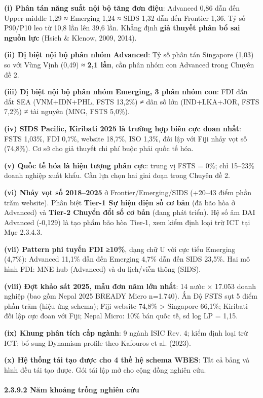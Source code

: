 \documentclass[12pt,a4paper]{article}
\begin{document}
\textbf{(i) Phân tán năng suất nội bộ tăng đơn điệu}: Advanced 0,86 dẫn
đến Upper-middle 1,29 ≈ Emerging 1,24 ≈ SIDS 1,32 dẫn đến Frontier 1,36.
Tỷ số P90/P10 leo từ 10,8 lần lên 39,6 lần. Khẳng định \textbf{giả
thuyết phân bổ sai nguồn lực} (Hsieh \& Klenow, 2009, 2014).

\textbf{(ii) Dị biệt nội bộ phân nhóm Advanced}: Tỷ số phân tán
Singapore (1,03) so với Vùng Vịnh (0,49) ≈ \textbf{2,1 lần}, cần phân
nhóm con Advanced trong Chuyên đề 2.

\textbf{(iii) Dị biệt nội bộ phân nhóm Emerging, 3 phân nhóm con}: FDI
dẫn dắt SEA (VNM+IDN+PHL, FSTS 13,2\%) ≠ dân số lớn (IND+LKA+JOR, FSTS
7,2\%) ≠ tài nguyên (MNG, FSTS 5,0\%).

\textbf{(iv) SIDS Pacific, Kiribati 2025 là trường hợp biên cực đoan
nhất}: FSTS 1,03\%, FDI 0,7\%, website 18,7\%, ISO 1,3\%, đối lập với
Fiji nhảy vọt số (74,8\%). Cơ sở cho giả thuyết chi phí buộc phải quốc
tế hóa.

\textbf{(v) Quốc tế hóa là hiện tượng phân cực}: trung vị FSTS = 0\%;
chỉ 15--23\% doanh nghiệp xuất khẩu. Cần lựa chọn hai giai đoạn trong
Chuyên đề 2.

\textbf{(vi) Nhảy vọt số 2018--2025} ở Frontier/Emerging/SIDS (+20--43
điểm phần trăm website). Phân biệt \textbf{Tier-1 Sự hiện diện số cơ
bản} (đã bão hòa ở Advanced) và \textbf{Tier-2 Chuyển đổi số cơ bản}
(đang phát triển). Hệ số âm DAI Advanced (-0,129) là tạo phẩm bão hòa
Tier-1, xem kiểm định loại trừ ICT tại Mục 2.3.4.3.

\textbf{(vii) Pattern phi tuyến FDI ≥10\%}, dạng chữ U với cực tiểu
Emerging (4,7\%): Advanced 11,1\% dẫn đến Emerging 4,7\% dẫn đến SIDS
23,5\%. Hai mô hình FDI: MNE hub (Advanced) và du lịch/viễn thông
(SIDS).

\textbf{(viii) Đợt khảo sát 2025, mẫu đơn năm lớn nhất}: 14 nước ×
17.053 doanh nghiệp (bao gồm Nepal 2025 BREADY Micro n=1.740). Ấn Độ
FSTS sụt 5 điểm phần trăm (hiệu ứng schema); Fiji website 74,8\%
\textgreater{} Singapore 66,1\%; Kiribati đối lập cực đoan với Fiji;
Nepal Micro: 10\% bán quốc tế, sd log LP = 1,15.

\textbf{(ix) Khung phân tích cấp ngành}: 9 ngành ISIC Rev. 4; kiểm định
loại trừ ICT; bổ sung Dynamism profile theo Kafouros et al. (2023).

\textbf{(x) Hệ thống tái tạo được cho 4 thế hệ schema WBES}: Tất cả bảng
và hình đều tái tạo được. Gói tái lập mở cho cộng đồng nghiên cứu.

\hypertarget{2392-nux103m-khoux1ea3ng-trux1ed1ng-nghiuxean-cux1ee9u}{%
\paragraph{2.3.9.2 Năm khoảng trống nghiên
cứu}\label{2392-nux103m-khoux1ea3ng-trux1ed1ng-nghiuxean-cux1ee9u}}
\end{document}
